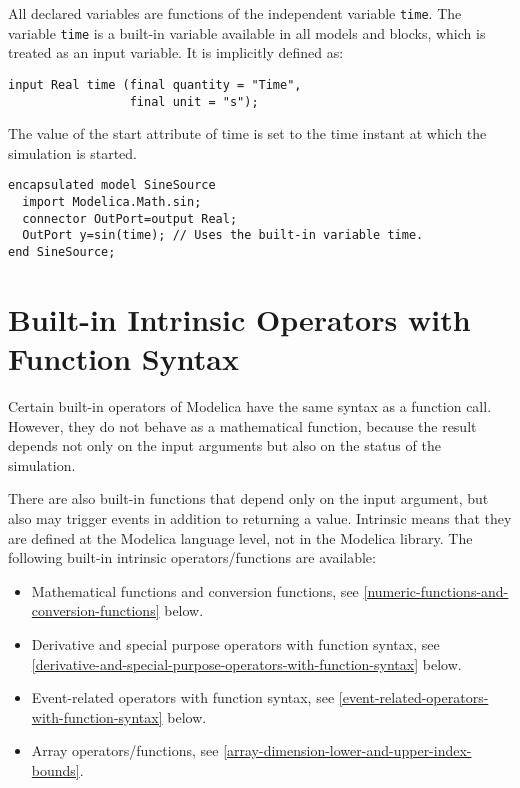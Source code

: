 All declared variables are functions of the independent variable \lstinline!time!.
The variable \lstinline!time! is a built-in variable available in all models and
blocks, which is treated as an input variable. It is implicitly defined
as:
\begin{lstlisting}[language=modelica]
input Real time (final quantity = "Time",
                 final unit = "s");
\end{lstlisting}

The value of the start attribute of time is set to the time instant at
which the simulation is started.

\begin{example}
\begin{lstlisting}[language=modelica]
encapsulated model SineSource
  import Modelica.Math.sin;
  connector OutPort=output Real;
  OutPort y=sin(time); // Uses the built-in variable time.
end SineSource;
\end{lstlisting}
\end{example}

\section{Built-in Intrinsic Operators with Function Syntax}

Certain built-in operators of Modelica have the same syntax as a
function call. However, they do not behave as a mathematical function,
because the result depends not only on the input arguments but also on
the status of the simulation.

There are also built-in functions that depend only on the input
argument, but also may trigger events in addition to returning a value.
Intrinsic means that they are defined at the Modelica language level,
not in the Modelica library. The following built-in intrinsic
operators/functions are available:
\begin{itemize}
\item
  Mathematical functions and conversion functions, see \autoref{numeric-functions-and-conversion-functions}
  below.
\item
  Derivative and special purpose operators with function syntax, see
  \autoref{derivative-and-special-purpose-operators-with-function-syntax} below.
\item
  Event-related operators with function syntax, see \autoref{event-related-operators-with-function-syntax} below.
\item
  Array operators/functions, see \autoref{array-dimension-lower-and-upper-index-bounds}.
\end{itemize}

